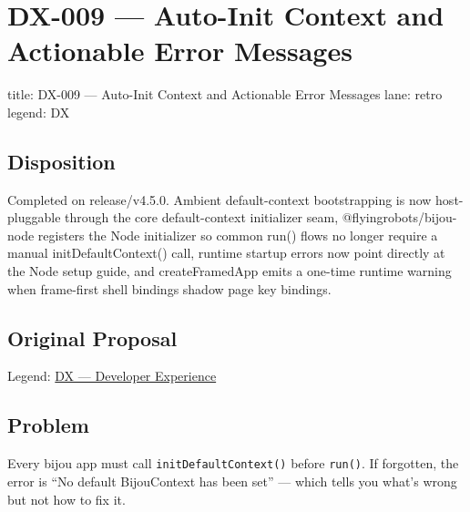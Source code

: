 \chapter{DX-009 --- Auto-Init Context and Actionable Error Messages}\label{record-341}

\smallskip

\begin{RecordMeta}
title: DX-009 — Auto-Init Context and Actionable Error Messages
lane: retro
legend: DX

\end{RecordMeta}

\section{Disposition}\label{record-341-disposition}

Completed on release/v4.5.0. Ambient default-context bootstrapping is now host-pluggable through the core default-context initializer seam, @flyingrobots/bijou-node registers the Node initializer so common run() flows no longer require a manual initDefaultContext() call, runtime startup errors now point directly at the Node setup guide, and createFramedApp emits a one-time runtime warning when frame-first shell bindings shadow page key bindings.

\section{Original Proposal}\label{record-341-original-proposal}

Legend: \href{https://github.com/flyingrobots/bijou/blob/1853ad902f6bf219326409e7f743a5a1d6517dbc/docs/method/legends/DX-developer-experience.md}{DX --- Developer Experience}

\section{Problem}\label{record-341-problem}

Every bijou app must call \texttt{i\allowbreak{}n\allowbreak{}i\allowbreak{}t\allowbreak{}D\allowbreak{}e\allowbreak{}f\allowbreak{}a\allowbreak{}u\allowbreak{}l\allowbreak{}t\allowbreak{}C\allowbreak{}o\allowbreak{}n\allowbreak{}t\allowbreak{}e\allowbreak{}x\allowbreak{}t\allowbreak{}(\allowbreak{})} before \texttt{r\allowbreak{}u\allowbreak{}n\allowbreak{}(\allowbreak{})}. If forgotten, the error is ``No default BijouContext has been set'' --- which tells you what's wrong but not how to fix it.

